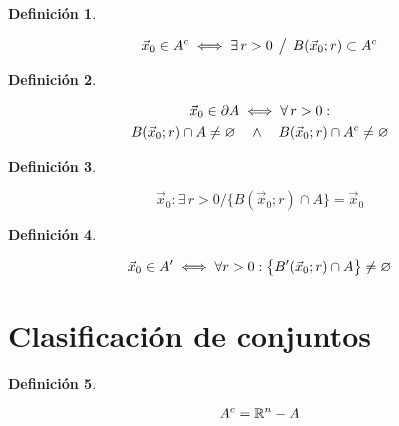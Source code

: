 \documentclass[a5paper,12pt,twoside]{book}
\newtheorem{defn}{{Definición}}[chapter]
\begin{document}
\begin{mdframed}[style=DefinitionFrame]
    \begin{defn}
    \end{defn}
    \begin{equation*}
        \Vec{x}_0 \in A^c \iff \exists \, r>0 \hspace{1ex} \big/ \hspace{1ex} B(\Vec{x}_0;r) \subset A^c
    \end{equation*}
\end{mdframed}

\begin{mdframed}[style=DefinitionFrame]
    \begin{defn}
    \end{defn}
    \begin{multline*}
        \Vec{x}_0 \in \partial A \iff \forall \, r>0 : \\ B(\Vec{x}_0;r) \cap A \neq \varnothing \quad \land \quad B(\Vec{x}_0;r) \cap A^c \neq \varnothing
    \end{multline*}
\end{mdframed}

\begin{mdframed}[style=DefinitionFrame]
    \begin{defn}
    \end{defn}
    \begin{equation*}
        \Vec{x}_0 : \exists \, r>0 / \big\{ B(\Vec{x}_0;r) \cap A \big\} = \Vec{x}_0
    \end{equation*}
\end{mdframed}

\begin{mdframed}[style=DefinitionFrame]
    \begin{defn}
        \label{defn:limitPoint}
    \end{defn}
    \begin{equation*}
        \Vec{x}_0 \in A' \iff \forall r>0 : \big\{ B'(\Vec{x}_0;r) \cap A \big\} \neq \varnothing
    \end{equation*}
\end{mdframed}


\section{Clasificación de conjuntos}

\begin{mdframed}[style=DefinitionFrame]
    \begin{defn}
    \end{defn}
    \begin{equation*}
        A^c = \mathbb{R}^n - A
    \end{equation*}
\end{mdframed}
\end{document}
